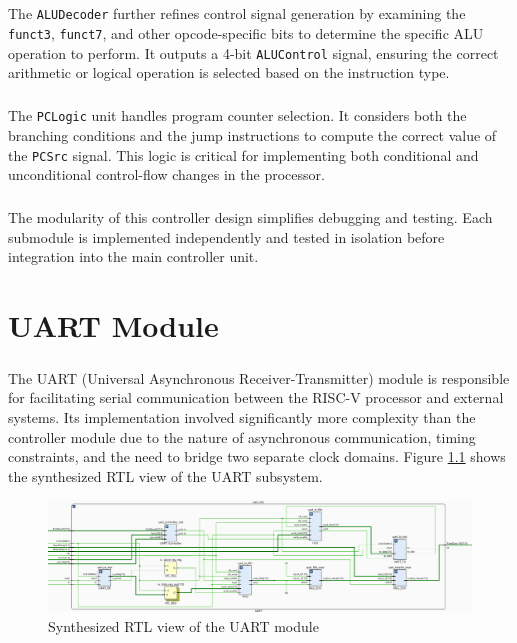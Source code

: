 \documentclass[12pt]{report}
\begin{document}
\paragraph{}
The \texttt{ALUDecoder} further refines control signal generation by examining the \texttt{funct3}, \texttt{funct7}, and other opcode-specific bits to determine the specific ALU operation to perform. It outputs a 4-bit \texttt{ALUControl} signal, ensuring the correct arithmetic or logical operation is selected based on the instruction type.

\paragraph{}
The \texttt{PCLogic} unit handles program counter selection. It considers both the branching conditions and the jump instructions to compute the correct value of the \texttt{PCSrc} signal. This logic is critical for implementing both conditional and unconditional control-flow changes in the processor.

\paragraph{}
The modularity of this controller design simplifies debugging and testing. Each submodule is implemented independently and tested in isolation before integration into the main controller unit.


\chapter{UART Module}

\paragraph{}
The UART (Universal Asynchronous Receiver-Transmitter) module is responsible for facilitating serial communication between the RISC-V processor and external systems. Its implementation involved significantly more complexity than the controller module due to the nature of asynchronous communication, timing constraints, and the need to bridge two separate clock domains. Figure \ref{fig:uart} shows the synthesized RTL view of the UART subsystem.

\begin{figure}[h]
    \centering
    \includegraphics[width=\textwidth]{figures/uart_rtl.png}
    \caption{Synthesized RTL view of the UART module}
    \label{fig:uart}
\end{figure}
\end{document}
